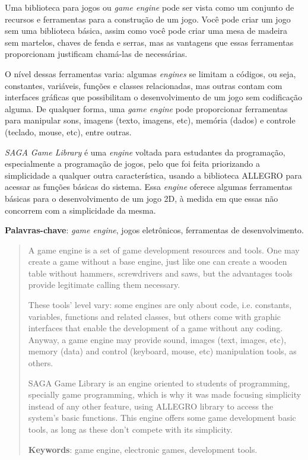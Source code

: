 \begin{resumo}

Uma biblioteca para jogos ou \textit{game engine} pode ser vista como um conjunto de recursos e ferramentas para a construção de um jogo. Você pode criar um jogo sem uma biblioteca básica, assim como você pode criar uma mesa de madeira sem martelos, chaves de fenda e serras, mas as vantagens que essas ferramentas proporcionam justificam chamá-las de necessárias.

O nível dessas ferramentas varia: algumas \textit{engines} se limitam a códigos, ou seja, constantes, variáveis, funções e classes relacionadas, mas outras contam com interfaces gráficas que possibilitam o desenvolvimento de um jogo sem codificação alguma. De qualquer forma, uma \textit{game engine} pode proporcionar ferramentas para manipular sons, imagens (texto, imagens, etc), memória (dados) e controle (teclado, mouse, etc), entre outras.

\textit{SAGA Game Library} é uma \textit{engine} voltada para estudantes da programação, especialmente a programação de jogos, pelo que foi feita priorizando a simplicidade a qualquer outra característica, usando a biblioteca ALLEGRO para acessar as funções básicas do sistema. Essa \textit{engine} oferece algumas ferramentas básicas para o desenvolvimento de um jogo 2D, à medida em que essas não concorrem com a simplicidade da mesma.

\vspace{1em}
\textbf{Palavras-chave}: \textit{game engine}, jogos eletrônicos, ferramentas de desenvolvimento.
\end{resumo}

\begin{abstract}
%
A game engine is a set of game development resources and tools. One may create a game without a base engine, just like one can create a wooden table without hammers, screwdrivers and saws, but the advantages tools provide legitimate calling them necessary.

These tools’ level vary: some engines are only about code, i.e. constants, variables, functions and related classes, but others come with graphic interfaces that enable the development of a game without any coding. Anyway, a game engine may provide sound, images (text, images, etc), memory (data) and control (keyboard, mouse, etc) manipulation tools, as others.

SAGA Game Library is an engine oriented to students of programming, specially game programming, which is why it was made focusing simplicity instead of any other feature, using ALLEGRO library to access the system's basic functions. This engine offers some game development basic tools, as long as these don't compete with its simplicity.

\vspace{2em}
\textbf{Keywords}: game engine, electronic games, development tools.
\end{abstract}
